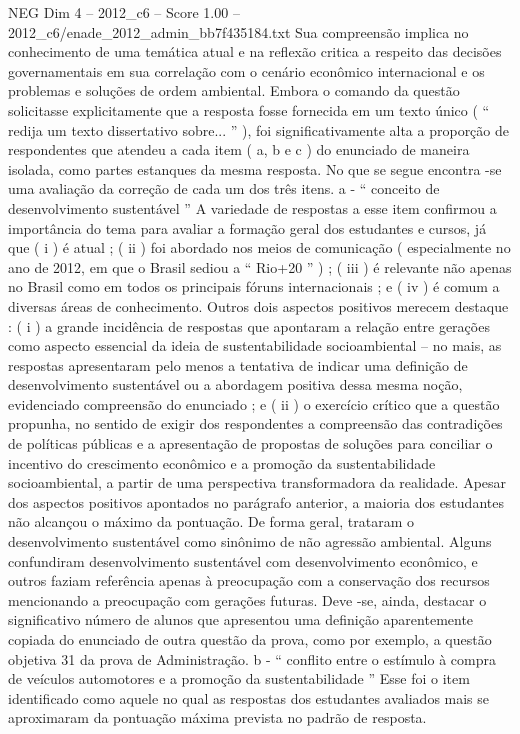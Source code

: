\begin{textsample}{NEG Dim 4 – 2012\_c6 – Score 1.00 – 2012\_c6/enade\_2012\_admin\_bb7f435184.txt}
Sua compreensão implica no conhecimento de uma temática atual e na reflexão critica a respeito das decisões governamentais em sua correlação com o cenário econômico internacional e os problemas e soluções de ordem ambiental.
Embora o comando da questão solicitasse explicitamente que a resposta fosse fornecida em um texto único ( “ redija um texto dissertativo sobre... ” ), foi significativamente alta a proporção de respondentes que atendeu a cada item ( a, b e c ) do enunciado de maneira isolada, como partes estanques da mesma resposta.
No que se segue encontra -se uma avaliação da correção de cada um dos três itens. a - “ conceito de desenvolvimento sustentável ” A variedade de respostas a esse item confirmou a importância do tema para avaliar a formação geral dos estudantes e cursos, já que ( i ) é atual ; ( ii ) foi abordado nos meios de comunicação ( especialmente no ano de 2012, em que o Brasil sediou a “ Rio+20 ” ) ; ( iii ) é relevante não apenas no Brasil como em todos os principais fóruns internacionais ; e ( iv ) é comum a diversas áreas de conhecimento.
Outros dois aspectos positivos merecem destaque : ( i ) a grande incidência de respostas que apontaram a relação entre gerações como aspecto essencial da ideia de sustentabilidade socioambiental – no mais, as respostas apresentaram pelo menos a tentativa de indicar uma definição de desenvolvimento sustentável ou a abordagem positiva dessa mesma noção, evidenciado compreensão do enunciado ; e ( ii ) o exercício crítico que a questão propunha, no sentido de exigir dos respondentes a compreensão das contradições de políticas públicas e a apresentação de propostas de soluções para conciliar o incentivo do crescimento econômico e a promoção da sustentabilidade socioambiental, a partir de uma perspectiva transformadora da realidade.
Apesar dos aspectos positivos apontados no parágrafo anterior, a maioria dos estudantes não alcançou o máximo da pontuação.
De forma geral, trataram o desenvolvimento sustentável como sinônimo de não agressão ambiental.
Alguns confundiram desenvolvimento sustentável com desenvolvimento econômico, e outros faziam referência apenas à preocupação com a conservação dos recursos mencionando a preocupação com gerações futuras.
Deve -se, ainda, destacar o significativo número de alunos que apresentou uma definição aparentemente copiada do enunciado de outra questão da prova, como por exemplo, a questão objetiva 31 da prova de Administração. b - “ conflito entre o estímulo à compra de veículos automotores e a promoção da sustentabilidade ” Esse foi o item identificado como aquele no qual as respostas dos estudantes avaliados mais se aproximaram da pontuação máxima prevista no padrão de resposta.

\end{textsample}
